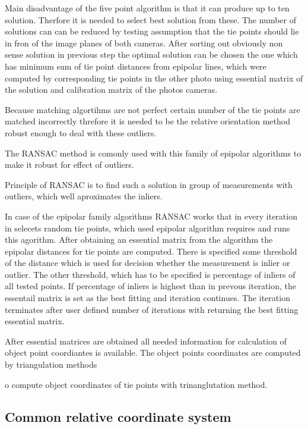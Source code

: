 \documentclass[a4paper,12pt]{report}
\begin{document}
Main disadvantage of the five point algorithm is that it can produce up to ten solution.
Therfore it is needed to select best solution from these. The number of solutions can
can be reduced by testing assumption that the tie points should lie in fron of the image 
planes of both cameras. After sorting out obviously non sense solution in previous step
 the optimal solution can be chosen the one which has minimum sum of tie point distances
 from epipolar lines, which were computed by corresponding tie points in the other photo
 using essential matrix of the solution and calibration matrix of the photos cameras.  

Because matching algortihms are not perfect  certain number of the tie points are matched 
incorrectly threfore it is needed to be the relative orientation method robust enough to
deal with these outliers.

The RANSAC \cite{RANSAC} method is comonly used with this family of epipolar algorithms to 
make it robust for effect of outliers.

Principle of RANSAC is to find such  a solution in group of measurements with outliers, 
which well aproximates the inliers. 

In case of the epipolar family algorithms RANSAC works that in every iteration 
in selecets random tie points, which used epipolar algorithm requires and 
runs this agorithm. After obtaining an essential matrix from the algorithm the epipolar 
distances for tie points are computed. There is specified some threshold of the distance which is used 
for decision whether the measurement is inlier or outlier. The other threshold, which has to be specified 
is percentage of inliers of all tested points. If percentage of inliers is highest than in prevous iteration,
the essentail matrix is set as the best fitting and iteration continues. The iteration terminates after user defined 
number of iterations with returning the best fitting essential matrix.


After essential matrices are obtained all needed information for calculation of object point coordiantes
is  available. The object points coordinates are computed by triangulation methods 

o compute object coordinates of tie points with trinanglutation
method.



\subsection{Common relative coordinate system}
\end{document}
